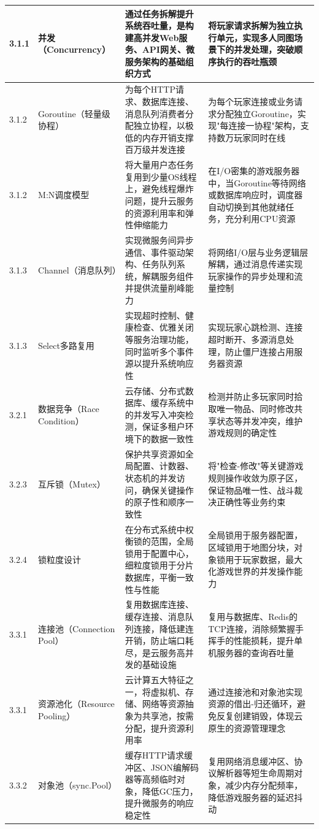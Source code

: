 \begin{longtable}{p{2.5cm}p{3cm}p{4.5cm}p{4.5cm}}
\hline
3.1.1 & 并发（Concurrency） & 通过任务拆解提升系统吞吐量，是构建高并发Web服务、API网关、微服务架构的基础组织方式 & 将玩家请求拆解为独立执行单元，实现多人同图场景下的并发处理，突破顺序执行的吞吐瓶颈 \\
\hline
3.1.2 & Goroutine（轻量级协程） & 为每个HTTP请求、数据库连接、消息队列消费者分配独立协程，以极低的内存开销支撑百万级并发连接 & 为每个玩家连接或业务请求分配独立Goroutine，实现"每连接一协程"架构，支持数万玩家同时在线 \\
\hline
3.1.2 & M:N调度模型 & 将大量用户态任务复用到少量OS线程上，避免线程爆炸问题，提升云服务的资源利用率和弹性伸缩能力 & 在I/O密集的游戏服务器中，当Goroutine等待网络或数据库响应时，调度器自动切换到其他就绪任务，充分利用CPU资源 \\
\hline
3.1.3 & Channel（消息队列） & 实现微服务间异步通信、事件驱动架构、任务队列系统，解耦服务组件并提供流量削峰能力 & 将网络I/O层与业务逻辑层解耦，通过消息传递实现玩家操作的异步处理和流量控制 \\
\hline
3.1.3 & Select多路复用 & 实现超时控制、健康检查、优雅关闭等服务治理功能，同时监听多个事件源以提升系统响应性 & 实现玩家心跳检测、连接超时断开、多源消息处理，防止僵尸连接占用服务器资源 \\
\hline
3.2.1 & 数据竞争（Race Condition） & 云存储、分布式数据库、缓存系统中的并发写入冲突检测，保证多租户环境下的数据一致性 & 检测并防止多玩家同时拾取唯一物品、同时修改共享状态等并发冲突，维护游戏规则的确定性 \\
\hline
3.2.3 & 互斥锁（Mutex） & 保护共享资源如全局配置、计数器、状态机的并发访问，确保关键操作的原子性和顺序一致性 & 将"检查-修改"等关键游戏规则操作收敛为原子区，保证物品唯一性、战斗裁决正确性等业务约束 \\
\hline
3.2.4 & 锁粒度设计 & 在分布式系统中权衡锁的范围，全局锁用于配置中心，细粒度锁用于分片数据库，平衡一致性与性能 & 全局锁用于服务器配置，区域锁用于地图分块，对象锁用于玩家数据，最大化游戏世界的并发操作能力 \\
\hline
3.3.1 & 连接池（Connection Pool） & 复用数据库连接、缓存连接、消息队列连接，降低建连开销，防止端口耗尽，是云服务高并发的基础设施 & 复用与数据库、Redis的TCP连接，消除频繁握手挥手的性能损耗，提升单机服务器的查询吞吐量 \\
\hline
3.3.1 & 资源池化（Resource Pooling） & 云计算五大特征之一，将虚拟机、存储、网络等资源抽象为共享池，按需分配，提升资源利用率 & 通过连接池和对象池实现资源的借出-归还循环，避免反复创建销毁，体现云原生的资源管理理念 \\
\hline
3.3.2 & 对象池（sync.Pool） & 缓存HTTP请求缓冲区、JSON编解码器等高频临时对象，降低GC压力，提升微服务的响应稳定性 & 复用网络消息缓冲区、协议解析器等短生命周期对象，减少内存分配频率，降低游戏服务器的延迟抖动 \\

\end{longtable}

